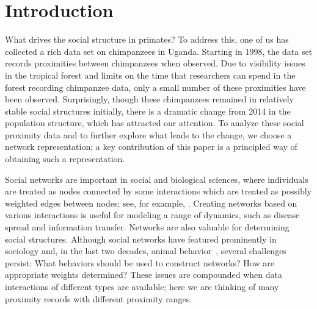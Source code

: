 \documentclass{article}
\theoremstyle{plain}
\theoremstyle{definition}
\theoremstyle{remark}
\begin{document}
\begin{abstract}
How can we identify groups of primate individuals which could be conjectured to drive social structure? To address this question, one of us has collected a time series of data for social interactions between chimpanzees. Here we use a network representation, leading to the task of combining these data into a time series of a single weighted network per time stamp, where different proximities should be given different weights reflecting their relative importance. We optimize these proximity-type weights in a principled way, using an innovative loss function which rewards structural consistency for consecutive time steps. The approach is empirically validated by carefully designed synthetic data. Using statistical tests, we provide a way of identifying groups of individuals that stay related for a significant length of time. Applying the approach to the chimpanzee data set, we detect cliques in the animal social network time series, which can be validated by real-world intuition from prior research and qualitative observations by chimpanzee experts.
\end{abstract}


\section{Introduction}
\label{sec:introduction}
What drives the social structure in primates? To address this, one of us has collected a rich data set on chimpanzees in Uganda. Starting in 1998, the data set records proximities between chimpanzees when observed. Due to visibility issues in the tropical forest and limits on the time that researchers can spend in the forest recording chimpanzee data, only a small number of these proximities have been observed. Surprisingly, though these chimpanzees remained in relatively stable social structures initially, there is a dramatic change from 2014 in the population structure, which has attracted our attention. To analyze these social proximity data and to further explore what leads to the change, we choose a network representation; a key contribution of this paper is a principled way of obtaining such a representation. 

Social networks are important in social and biological sciences, where individuals are treated as nodes connected by some interactions which are treated as possibly weighted edges between nodes; see, for example, \citet{wasserman1994social}. Creating networks based on various interactions is useful for modeling a range of dynamics, such as disease spread and information transfer. Networks are also valuable for determining social structures. Although social networks have featured prominently in sociology and, in the last two decades, animal behavior~\citep{pinter2014dynamics}, several challenges persist: What behaviors should be used to construct networks? How are appropriate weights determined? 
These issues are compounded when data interactions of different types are available; here we are thinking of many proximity records with different proximity ranges. 
\end{document}
